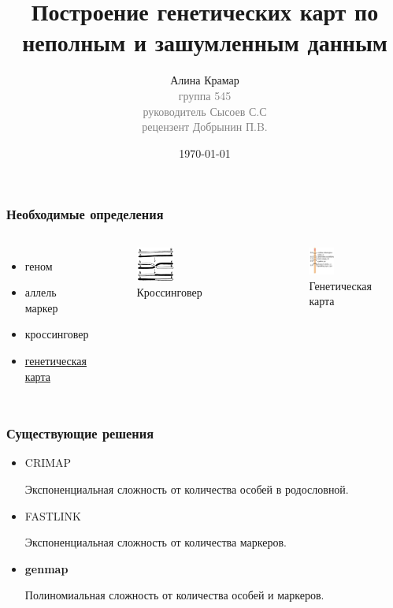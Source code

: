 \documentclass{beamer}
\title{Построение генетических карт по неполным и
зашумленным данным}
\author{Алина Крамар\\
  { \footnotesize \textcolor{gray}{группа 545\\ руководитель Сысоев
      С.С\\ рецензент Добрынин П.B.}}}
\institute{Санкт-Петербургский государственный университет}
\date{\today}
\begin{document}
\newcommand{\genmap}{\textbf{genmap}}

\begin{frame}
\titlepage
\end{frame}

\begin{frame}
  \frametitle{Необходимые определения}

  \begin{columns}
    \begin{itemize}
    \item геном
    \item аллель маркер
    \item кроссинговер
    \item \underline{генетическая карта}
    \end{itemize}

    \begin{figure}
      \includegraphics[width=0.4\textwidth]{cross.png}
      \caption{Кроссинговер}
    \end{figure}
    \begin{figure}
      \includegraphics[width=0.4\textwidth]{map.png}
      \caption{Генетическая карта}
    \end{figure}

  \end{columns}
\end{frame}

\begin{frame}
  \frametitle{Существующие решения}
  \begin{itemize}
  \item CRIMAP

    Экспоненциальная сложность от количества особей в родословной.
  \item FASTLINK

    Экспоненциальная сложность от количества маркеров.
  \item \genmap

    Полиномиальная сложность от количества особей и маркеров.
  \end{itemize}
\end{frame}
\end{document}
